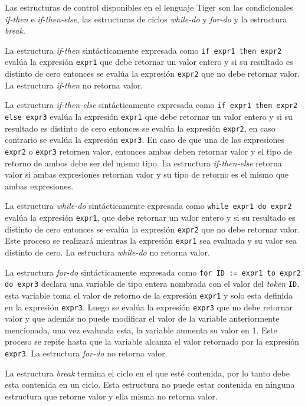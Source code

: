 \documentclass{article}
\begin{document}
Las estructuras de control disponibles en el lenguaje Tiger son las
condicionales \emph{if-then} e \emph{if-then-else}, las estructuras de ciclos
\emph{while-do} y \emph{for-do} y la estructura \emph{break}.

La estructura \emph{if-then} sintácticamente expresada como
\verb|if expr1 then expr2| evalúa la expresión \verb|expr1| que debe retornar
un valor entero y si su resultado es distinto de cero entonces se evalúa la
expresión \verb|expr2| que no debe retornar valor. La estructura \emph{if-then}
no retorna valor.

La estructura \emph{if-then-else} sintácticamente expresada como
\verb|if expr1 then expr2 else expr3| evalúa la expresión \verb|expr1| que debe
retornar un valor entero y si su resultado es distinto de cero entonces se
evalúa la expresión \verb|expr2|, en caso contrario se evalúa la expresión
\verb|expr3|. En caso de que una de las expresiones \verb|expr2| o \verb|expr3|
retornen valor, entonces ambas deben retornar valor y el tipo de retorno de
ambos debe ser del mismo tipo. La estructura \emph{if-then-else} retorna valor
si ambas expresiones retornan valor y su tipo de retorno es el mismo que ambas
expresiones.

La estructura \emph{while-do} sintácticamente expresada como
\verb|while expr1 do expr2| evalúa la expresión \verb|expr1|, que debe retornar
un valor entero y si su resultado es distinto de cero entonces se evalúa la
expresión \verb|expr2| que no debe retornar valor. Este proceso se realizará
mientras la expresión \verb|expr1| sea evaluada y su valor sea distinto de cero.
La estructura \emph{while-do} no retorna valor.

La estructura \emph{for-do} sintácticamente expresada como
\verb|for ID := expr1 to expr2 do expr3| declara una variable de tipo entera
nombrada con el valor del \emph{token} \verb|ID|, esta variable toma el valor
de retorno de la expresión \verb|expr1| y solo esta definida en la expresión
\verb|expr3|. Luego se evalúa la expresión \verb|expr3| que no debe retornar
valor y que además no puede modificar el valor de la variable anteriormente
mencionada, una vez evaluada esta, la variable aumenta su valor en 1. Este
proceso se repite hasta que la variable alcanza el valor retornado por la
expresión \verb|expr3|. La estructura \emph{for-do} no retorna valor.

La estructura \emph{break} termina el ciclo en el que esté contenida, por lo
tanto debe esta contenida en un ciclo. Esta estructura no puede estar contenida
en ninguna estructura que retorne valor y ella misma no retorna valor.
\end{document}
